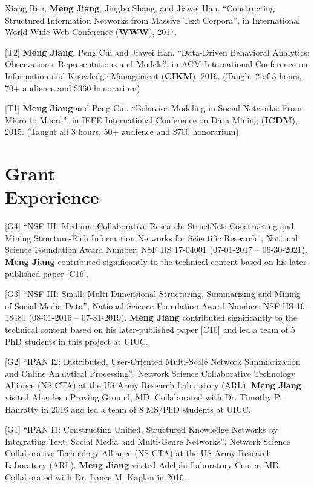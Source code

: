 \documentclass[margin, 9pt]{res}
\begin{document}
\begin{resume}
[T3] Xiang Ren, \textbf{Meng Jiang}, Jingbo Shang, and Jiawei Han. ``Constructing Structured Information Networks from Massive Text Corpora'', in International World Wide Web Conference (\textbf{WWW}), 2017.

[T2] \textbf{Meng Jiang}, Peng Cui and Jiawei Han. ``Data-Driven Behavioral Analytics: Observations, Representations and Models'', in ACM International Conference on Information and Knowledge Management (\textbf{CIKM}), 2016. (Taught 2 of 3 hours, 70+ audience and \$360 honorarium)

[T1] \textbf{Meng Jiang} and Peng Cui. ``Behavior Modeling in Social Networks: From Micro to Macro'', in IEEE International Conference on Data Mining (\textbf{ICDM}), 2015. (Taught all 3 hours, 50+ audience and \$700 honorarium)


\section{Grant \\ Experience}

[G4] ``NSF III: Medium: Collaborative Research: StructNet: Constructing and Mining Structure-Rich Information Networks for Scientific Research'', National Science Foundation Award Number: NSF IIS 17-04001 (07-01-2017 -- 06-30-2021). \textbf{Meng Jiang} contributed significantly to the technical content based on his later-published paper [C16].

[G3] ``NSF III: Small: Multi-Dimensional Structuring, Summarizing and Mining of Social Media Data'', National Science Foundation Award Number: NSF IIS 16-18481 (08-01-2016 -- 07-31-2019). \textbf{Meng Jiang} contributed significantly to the technical content based on his later-published paper [C10] and led a team of 5 PhD students in this project at UIUC.

[G2] ``IPAN I2: Distributed, User-Oriented Multi-Scale Network Summarization and Online Analytical Processing'', Network Science Collaborative Technology Alliance (NS CTA) at the US Army Research Laboratory (ARL). \textbf{Meng Jiang} visited Aberdeen Proving Ground, MD. Collaborated with Dr. Timothy P. Hanratty in 2016 and led a team of 8 MS/PhD students at UIUC.

[G1] ``IPAN I1: Constructing Unified, Structured Knowledge Networks by Integrating Text, Social Media and Multi-Genre Networks'', Network Science Collaborative Technology Alliance (NS CTA) at the US Army Research Laboratory (ARL). \textbf{Meng Jiang} visited Adelphi Laboratory Center, MD. Collaborated with Dr. Lance M. Kaplan in 2016.


\end{resume}
\end{document}
